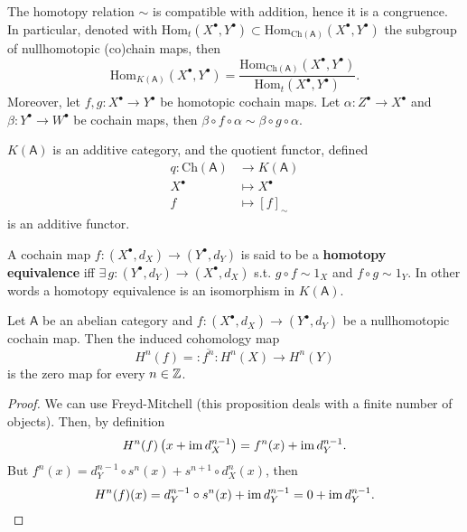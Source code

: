 \begin{rem}[]
	The homotopy relation $\sim$ is compatible with addition, hence it is a congruence.
	In particular, denoted with
	$\mathrm{Hom}_{t}\left( X^\bullet, Y^\bullet \right) \subset
	\mathrm{Hom}_{\mathrm{Ch}(\mathsf{A})}\left( X^\bullet, Y^\bullet \right)$ the subgroup of
	nullhomotopic (co)chain maps, then
	\begin{equation}
		\mathrm{Hom}_{K(\mathsf{A})}\left( X^\bullet, Y^\bullet \right) =
		\frac{\mathrm{Hom}_{\mathrm{Ch}(\mathsf{A})}\left( X^\bullet, Y^\bullet \right)}{
		\mathrm{Hom}_{t}\left( X^\bullet, Y^\bullet \right)}
	.\end{equation} 
	Moreover, let $f,g: X^\bullet \to Y^\bullet$ be homotopic cochain maps.
	Let $\alpha: Z^\bullet \to X^\bullet$ and $\beta: Y^\bullet \to W^\bullet$ be cochain maps,
	then $\beta \circ f \circ \alpha \sim \beta \circ g \circ \alpha$.
\end{rem}

\begin{prop}
	$K(\mathsf{A})$ is an additive category, and the quotient functor,
	defined
	\begin{align}
		q: \mathrm{Ch}(\mathsf{A}) &\to K(\mathsf{A}) \\
		X^\bullet &\mapsto X^\bullet\\
		f &\mapsto [f]_{\sim}
	\end{align} 
	is an additive functor.
\end{prop} 

\begin{defn}
	A cochain map $f: \left( X^{\bullet}, d_{X} \right) \to \left( Y^{\bullet}, d_{Y} \right)$
	is said to be a \textbf{homotopy equivalence} iff
	$\exists\, g: \left( Y^{\bullet}, d_{Y} \right) \to \left( X^{\bullet}, d_{X} \right)$
	s.t.
	$g \circ f \sim 1_X$ and $f \circ g \sim 1_Y$.
	In other words a homotopy equivalence is an isomorphism in $K(\mathsf{A})$.
\end{defn}

\begin{prop}
	Let $\mathsf{A}$ be an abelian category and
	$f: \left( X^{\bullet}, d_{X} \right) \to \left( Y^{\bullet}, d_{Y} \right)$ be a
	nullhomotopic cochain map.
	Then the induced cohomology map
	\begin{equation}
		H^n(f) =: \overline{f^n}: H^n(X) \to H^n(Y)
	\end{equation} 
	is the zero map for every $n \in \mathbb{Z}$.
\end{prop} 
\begin{proof}
	We can use Freyd-Mitchell (this proposition deals with a finite number of objects).
	Then, by definition
	\begin{equation}
		H^n(f) \left( x + \operatorname{im} d_X^{n-1} \right) = f^n(x) + \operatorname{im} d_Y^{n-1}
	.\end{equation} 
	But $f^n(x) = d^{n-1}_Y \circ s^n(x) + s^{n+1} \circ d_X^{n}(x)$,
	then
	\begin{equation}
		H^n(f)(x) = d^{n-1}_Y \circ s^n (x) + \operatorname{im} d_Y^{n-1} = 0 + \operatorname{im} d_Y^{n-1}
	.\end{equation} 
\end{proof}

